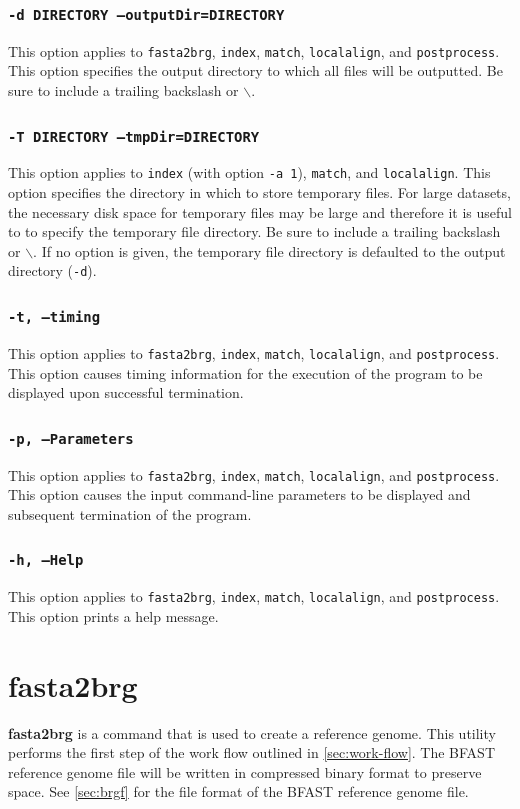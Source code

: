 \documentclass[a4paper,12pt]{book}
\newcommand{\TT}[1]{{\tt #1}} %
\newcommand{\BF}[1]{{\bf #1}} %
\newcommand{\BRGF}{BFAST reference genome file} %
\begin{document}
\subsubsection{\TT{-d DIRECTORY --outputDir=DIRECTORY}}
This option applies to \TT{fasta2brg}, \TT{index}, \TT{match}, \TT{localalign}, and \TT{postprocess}.
This option specifies the output directory to which all files will be outputted.
Be sure to include a trailing backslash or $\backslash$.

\subsubsection{\TT{-T DIRECTORY --tmpDir=DIRECTORY}}
This option applies to \TT{index} (with option \TT{-a 1}), \TT{match}, and \TT{localalign}.
This option specifies the directory in which to store temporary files.
For large datasets, the necessary disk space for temporary files may be large and therefore it is useful to to specify the temporary file directory. 
Be sure to include a trailing backslash or $\backslash$.
If no option is given, the temporary file directory is defaulted to the output directory (\TT{-d}).

\subsubsection{\TT{-t, --timing}}
This option applies to \TT{fasta2brg}, \TT{index}, \TT{match}, \TT{localalign}, and \TT{postprocess}.
This option causes timing information for the execution of the program to be displayed upon successful termination.

\subsubsection{\TT{-p, --Parameters}}
This option applies to \TT{fasta2brg}, \TT{index}, \TT{match}, \TT{localalign}, and \TT{postprocess}.
This option causes the input command-line parameters to be displayed and subsequent termination of the program.

\subsubsection{\TT{-h, --Help}}
This option applies to \TT{fasta2brg}, \TT{index}, \TT{match}, \TT{localalign}, and \TT{postprocess}.
This option prints a help message.

\section{fasta2brg}
\label{sec:fasta2brg}
\BF{fasta2brg} is a command that is used to create a reference genome.
This utility performs the first step of the work flow outlined in \autoref{sec:work-flow}.
The \BRGF{} will be written in compressed binary format to preserve space.
See \autoref{sec:brgf} for the file format of the \BRGF{}.
\end{document}
